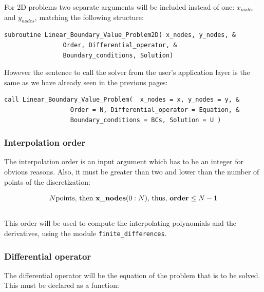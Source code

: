 For 2D problems two separate arguments will be included instead of one:
$x_{nodes}$ and $y_{nodes}$, matching the following structure: \\

\begin{blueframed}
\begin{lstlisting}
subroutine Linear_Boundary_Value_Problem2D( x_nodes, y_nodes, &
 				Order, Differential_operator, &
 				Boundary_conditions, Solution)

\end{lstlisting}
\end{blueframed}

However the sentence to call the solver from the user's application layer is the
same as we have already seen in the previous pages: \\

\begin{blueframed}
\begin{lstlisting}                    
call Linear_Boundary_Value_Problem(  x_nodes = x, y_nodes = y, & 
                  Order = N, Differential_operator = Equation, &
                  Boundary_conditions = BCs, Solution = U )

\end{lstlisting}
\end{blueframed}

\subsubsection{Interpolation order}

The interpolation order is an input argument which has to be an integer for
obvious reasons. Also, it must be greater than two and lower than the number of
points of the discretization:

$$
N \text{points, then } \mathbf{x\_nodes}(0:N) \text{, thus, \textbf{order}} \le
N-1 $$\\

This order will be used to compute the interpolating polynomials and the
derivatives, using the module \texttt{finite\_differences}. \\

\newpage

\subsubsection{Differential operator}

The differential operator will be the equation of the problem that is to be
solved. This must be declared as a function: 

